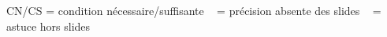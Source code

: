 
\hfill{\Legende CN/CS = condition nécessaire/suffisante \ \Warn{} = précision absente des slides \ \astsym{} = astuce hors slides}\par
\vspace{2pt}
